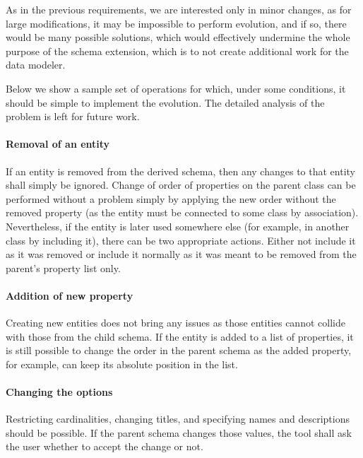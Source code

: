 As in the previous requirements, we are interested only in minor changes, as for large modifications, it may be impossible to perform evolution, and if so, there would be many possible solutions, which would effectively undermine the whole purpose of the schema extension, which is to not create additional work for the data modeler.

Below we show a sample set of operations for which, under some conditions, it should be simple to implement the evolution. The detailed analysis of the problem is left for future work.

\paragraph{Removal of an entity} If an entity is removed from the derived schema, then any changes to that entity shall simply be ignored. Change of order of properties on the parent class can be performed without a problem simply by applying the new order without the removed property (as the entity must be connected to some class by association). Nevertheless, if the entity is later used somewhere else (for example, in another class by including it), there can be two appropriate actions. Either not include it as it was removed or include it normally as it was meant to be removed from the parent's property list only.

\paragraph{Addition of new property} Creating new entities does not bring any issues as those entities cannot collide with those from the child schema. If the entity is added to a list of properties, it is still possible to change the order in the parent schema as the added property, for example, can keep its absolute position in the list.

\paragraph{Changing the options} Restricting cardinalities, changing titles, and specifying names and descriptions should be possible. If the parent schema changes those values, the tool shall ask the user whether to accept the change or not.

